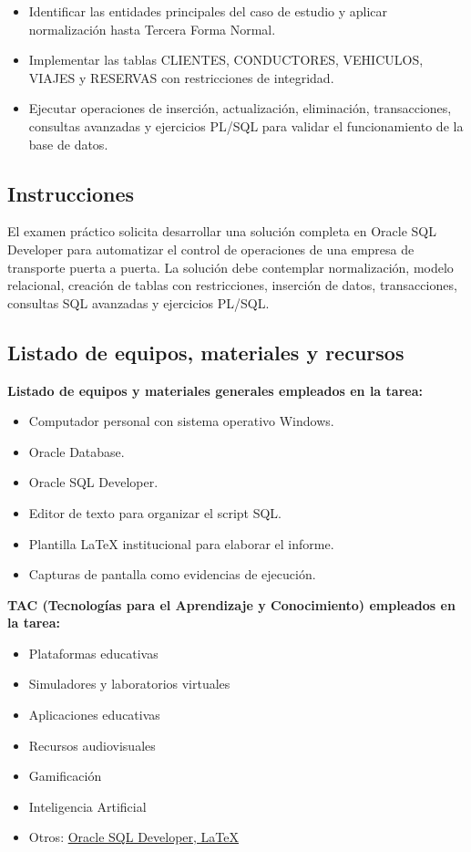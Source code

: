 \documentclass{article}
\begin{document}
\begin{itemize}
    \item Identificar las entidades principales del caso de estudio y aplicar normalización hasta Tercera Forma Normal.
    \item Implementar las tablas CLIENTES, CONDUCTORES, VEHICULOS, VIAJES y RESERVAS con restricciones de integridad.
    \item Ejecutar operaciones de inserción, actualización, eliminación, transacciones, consultas avanzadas y ejercicios PL/SQL para validar el funcionamiento de la base de datos.
\end{itemize}

\subsection{Instrucciones}

El examen práctico solicita desarrollar una solución completa en Oracle SQL Developer para automatizar el control de operaciones de una empresa de transporte puerta a puerta. La solución debe contemplar normalización, modelo relacional, creación de tablas con restricciones, inserción de datos, transacciones, consultas SQL avanzadas y ejercicios PL/SQL.

\subsection{Listado de equipos, materiales y recursos}

\textbf{Listado de equipos y materiales generales empleados en la tarea:}

\begin{itemize}
    \item Computador personal con sistema operativo Windows.
    \item Oracle Database.
    \item Oracle SQL Developer.
    \item Editor de texto para organizar el script SQL.
    \item Plantilla LaTeX institucional para elaborar el informe.
    \item Capturas de pantalla como evidencias de ejecución.
\end{itemize}

\textbf{TAC (Tecnologías para el Aprendizaje y Conocimiento) empleados en la tarea:}

\begin{itemize}
    \item[$\boxtimes$] Plataformas educativas
    \item[$\square$] Simuladores y laboratorios virtuales
    \item[$\boxtimes$] Aplicaciones educativas
    \item[$\square$] Recursos audiovisuales
    \item[$\square$] Gamificación
    \item[$\boxtimes$] Inteligencia Artificial
    \item Otros: \underline{Oracle SQL Developer, LaTeX}
\end{itemize}
\end{document}
